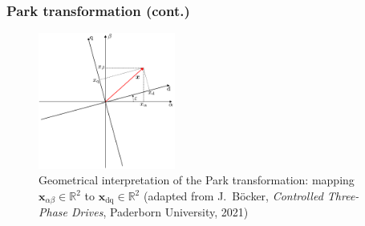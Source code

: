 \begin{frame}
	\frametitle{Park transformation (cont.)}
    \begin{figure}
        \centering
        \includegraphics[width=0.4\textwidth]{fig/lec06/Alphabeta_dq_vectors.pdf}
        \caption{Geometrical interpretation of the Park
        transformation: mapping $\bm{x}_{\alpha\beta}\in\mathbb{R}^2$ to $\bm{x}_{\mathrm{dq}}\in\mathbb{R}^2$ (adapted from J.~B\"ocker, \textit{Controlled Three-Phase Drives}, Paderborn University, 2021)}
        \label{fig:Alphabeta_dq_vectors}
    \end{figure}    
\end{frame}

